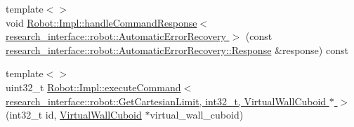 \begin{DoxyCompactItemize}
\item 
{\footnotesize template$<$$>$ }\\void \hyperlink{namespacefranka_a4117308d6f88c238559eb727c0329013}{Robot\+::\+Impl\+::handle\+Command\+Response$<$ research\+\_\+interface\+::robot\+::\+Automatic\+Error\+Recovery $>$} (const \hyperlink{structresearch__interface_1_1robot_1_1CommandBase_ae8b503e2bc7d72e70b6eb08421e0d853}{research\+\_\+interface\+::robot\+::\+Automatic\+Error\+Recovery\+::\+Response} \&response) const
\item 
{\footnotesize template$<$$>$ }\\uint32\+\_\+t \hyperlink{namespacefranka_a60d46a3f821f6f0faf942974d0c63146}{Robot\+::\+Impl\+::execute\+Command$<$ research\+\_\+interface\+::robot\+::\+Get\+Cartesian\+Limit, int32\+\_\+t, Virtual\+Wall\+Cuboid $\ast$ $>$} (int32\+\_\+t id, \hyperlink{structfranka_1_1VirtualWallCuboid}{Virtual\+Wall\+Cuboid} $\ast$virtual\+\_\+wall\+\_\+cuboid)
\end{DoxyCompactItemize}

